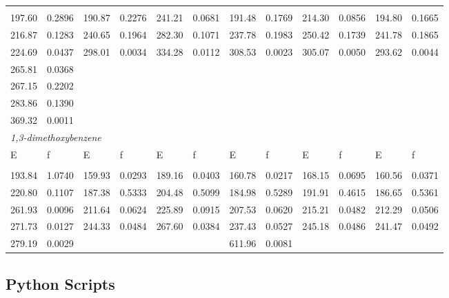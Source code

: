 \documentclass[
journal=jpcbfk, %
manuscript=article]{achemso}
\begin{document}
\begin{table}[ht]
\begin{tabular}[l]{llllllllllll}
							\hline\hline
							\\[-0.5ex]
							197.60 &  0.2896 &  190.87 &  0.2276 &  241.21 &  0.0681 &  191.48 &  0.1769 &  214.30 &  0.0856 &  194.80 &  0.1665 \\
							216.87 &  0.1283 &  240.65 &  0.1964 &  282.30 &  0.1071 &  237.78 &  0.1983 &  250.42 &  0.1739 &  241.78 &  0.1865 \\
							224.69 &  0.0437 &  298.01 &  0.0034 &  334.28 &  0.0112 &  308.53 &  0.0023 &  305.07 &  0.0050 &  293.62 &  0.0044 \\
							265.81 &  0.0368 & ~  & ~  & ~  & ~  & ~  & ~  & ~  & ~  & ~  & ~ \\
							267.15 &  0.2202 & ~  & ~  & ~  & ~  & ~  & ~  & ~  & ~  & ~  & ~ \\ 
							283.86 &  0.1390 & ~  & ~  & ~  & ~  & ~  & ~  & ~  & ~  & ~  & ~ \\
							369.32 &  0.0011 & ~  & ~  & ~  & ~  & ~  & ~  & ~  & ~  & ~  & ~ \\ [1ex]  
							\multicolumn{10}{l}{\textit{1,3-dimethoxybenzene}} \\ [1ex]
							E    & f    & E    & f    & E    & f    & E    & f    & E    & f    & E    & f \\ [0.5ex]
							\hline\hline
							\\[-0.5ex]
							193.84 &  1.0740 &  159.93 &  0.0293 &  189.16 &  0.0403 &  160.78 &  0.0217 &  168.15 &  0.0695 &  160.56 &  0.0371 \\
							220.80 &  0.1107 &  187.38 &  0.5333 &  204.48 &  0.5099 &  184.98 &  0.5289 &  191.91 &  0.4615 &  186.65 &  0.5361 \\
							261.93 &  0.0096 &  211.64 &  0.0624 &  225.89 &  0.0915 &  207.53 &  0.0620 &  215.21 &  0.0482 &  212.29 &  0.0506 \\
							271.73 &  0.0127 &  244.33 &  0.0484 &  267.60 &  0.0384 &  237.43 &  0.0527 &  245.18 &  0.0486 &  241.47 &  0.0492 \\
							279.19 &  0.0029 & ~  & ~  & ~  & ~  &  611.96 &  0.0081 & ~  & ~  & ~  &  ~ \\ [1ex]
						\end{tabular}
					\end{table}
					
					\pagebreak
	
	\subsection{Python Scripts}
\end{document}

